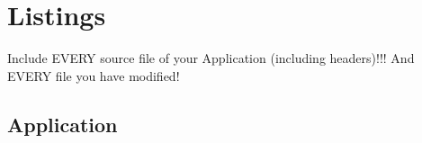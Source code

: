 \documentclass[12pt,a4paper,titlepage,oneside]{article}
\begin{document}
\newpage
\appendix
\section{Listings}
\small{

Include EVERY source file of your Application (including headers)!!!
And EVERY file you have modified!

\subsection{Application}


























}%
\end{document}

